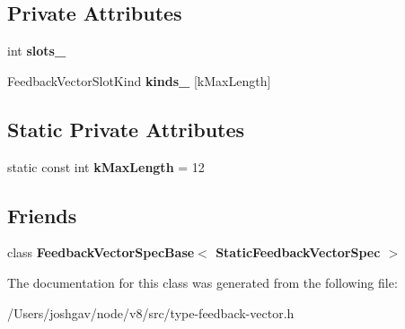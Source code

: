 \subsection*{Private Attributes}
\begin{DoxyCompactItemize}
\item 
int {\bfseries slots\+\_\+}\hypertarget{classv8_1_1internal_1_1_static_feedback_vector_spec_aec3e3b664f40db30ae8819b9498dc785}{}\label{classv8_1_1internal_1_1_static_feedback_vector_spec_aec3e3b664f40db30ae8819b9498dc785}

\item 
Feedback\+Vector\+Slot\+Kind {\bfseries kinds\+\_\+} \mbox{[}k\+Max\+Length\mbox{]}\hypertarget{classv8_1_1internal_1_1_static_feedback_vector_spec_a372484660c4e71a5afd5900862c8423d}{}\label{classv8_1_1internal_1_1_static_feedback_vector_spec_a372484660c4e71a5afd5900862c8423d}

\end{DoxyCompactItemize}
\subsection*{Static Private Attributes}
\begin{DoxyCompactItemize}
\item 
static const int {\bfseries k\+Max\+Length} = 12\hypertarget{classv8_1_1internal_1_1_static_feedback_vector_spec_a4c789a11e3ecef975e42d0e12e064d22}{}\label{classv8_1_1internal_1_1_static_feedback_vector_spec_a4c789a11e3ecef975e42d0e12e064d22}

\end{DoxyCompactItemize}
\subsection*{Friends}
\begin{DoxyCompactItemize}
\item 
class {\bfseries Feedback\+Vector\+Spec\+Base$<$ Static\+Feedback\+Vector\+Spec $>$}\hypertarget{classv8_1_1internal_1_1_static_feedback_vector_spec_af8fe87a97f1876f7200b454381bc8524}{}\label{classv8_1_1internal_1_1_static_feedback_vector_spec_af8fe87a97f1876f7200b454381bc8524}

\end{DoxyCompactItemize}


The documentation for this class was generated from the following file\+:\begin{DoxyCompactItemize}
\item 
/\+Users/joshgav/node/v8/src/type-\/feedback-\/vector.\+h\end{DoxyCompactItemize}
